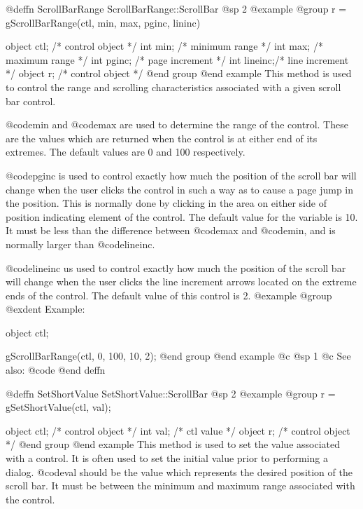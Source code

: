 @deffn {ScrollBarRange} ScrollBarRange::ScrollBar
@sp 2
@example
@group
r = gScrollBarRange(ctl, min, max, pginc, lininc)

object  ctl;    /*  control object  */
int     min;    /*  minimum range   */
int     max;    /*  maximum range   */
int     pginc;  /*  page increment  */
int     lineinc;/*  line increment  */
object  r;      /*  control object  */
@end group
@end example
This method is used to control the range and scrolling characteristics
associated with a given scroll bar control.

@code{min} and @code{max} are used to determine the range of the
control.  These are the values which are returned when the control
is at either end of its extremes.  The default values are 0 and
100 respectively.

@code{pginc} is used to control exactly how much the position of the
scroll bar will change when the user clicks the control in such a way
as to cause a page jump in the position.  This is normally done by
clicking in the area on either side of position indicating element of the
control.  The default value for the variable is 10.  It must be less than
the difference between @code{max} and @code{min}, and is normally larger
than @code{lineinc}.

@code{lineinc} us used to control exactly how much the position of the
scroll bar will change when the user clicks the line increment arrows
located on the extreme ends of the control.  The default value of this
control is 2.
@example
@group
@exdent Example:

object  ctl;

gScrollBarRange(ctl, 0, 100, 10, 2);
@end group
@end example
@c @sp 1
@c See also:  @code{}
@end deffn














@deffn {SetShortValue} SetShortValue::ScrollBar
@sp 2
@example
@group
r = gSetShortValue(ctl, val);

object  ctl;    /*  control object  */
int     val;    /*  ctl value       */
object  r;      /*  control object  */
@end group
@end example
This method is used to set the value associated with a control.  It is
often used to set the initial value prior to performing a dialog.
@code{val} should be the value which represents the desired
position of the scroll bar.  It must be between the minimum and
maximum range associated with the control.

